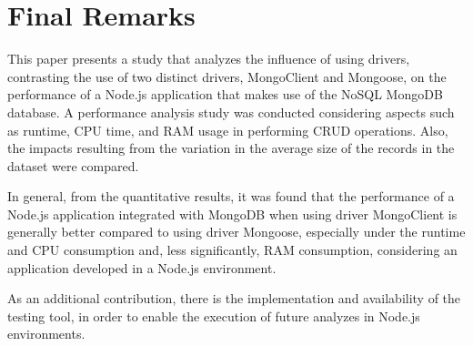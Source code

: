 \documentclass{svproc}
\begin{document}
\section{Final Remarks}
\label{section:consideracoes}

This paper presents a study that analyzes the influence of using drivers, contrasting the use of two distinct drivers, MongoClient and Mongoose, on the performance of a Node.js application that makes use of the NoSQL MongoDB database.%
A performance analysis study was conducted considering aspects such as runtime, CPU time, and RAM usage in performing CRUD operations. Also, the impacts resulting from the variation in the average size of the records in the dataset were compared.

In general, from the quantitative results, it was found that the performance of a Node.js application integrated with MongoDB when using driver MongoClient is generally better compared to using driver Mongoose, especially under the runtime and CPU consumption and, less significantly, RAM consumption, considering an application developed in a Node.js environment.

As an additional contribution, there is the implementation and availability of the testing tool, in order to enable the execution of future analyzes in Node.js environments.

%
%
%
%
\end{document}
